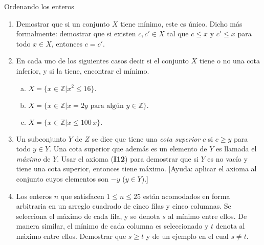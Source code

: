 \begin{section}{Ordenando los enteros}
\begin{enumerate}[1)]
\item Demostrar que si un conjunto $X$ tiene mínimo, este es único. Dicho más formalmente: demostrar que si existen $c,c' \in X$ tal que  $c\le x$ y $c'\le x$ para todo $x \in X$, entonces $c=c'$. 

\item En cada uno de los siguientes casos decir
si el conjunto $X$ tiene o no una cota inferior, y si la tiene,
encontrar el mínimo.

\begin{enumerate}[a)]
	\item $X = \{x \in \mathbb Z | x^2\le 16\}.$
	
	\item $X =\{x \in \mathbb Z | x=2y \text{\ para algún } y \in \mathbb Z\}.$
	
	\item $X =\{x \in \mathbb Z | x\le 100\,x\} .$
\end{enumerate}
%
%

\item Un subconjunto $Y$ de $Z$ se dice que tiene una {\em cota superior} $c$ si $c\ge y$ para todo $y \in Y$. 
Una cota superior que además es un elemento de $Y$ es llamada el {\em máximo} de
$Y$. Usar el axioma ({\bf I12}) para demostrar que si $Y$ es no vacío
y tiene una cota superior, entonces tiene máximo. [Ayuda: aplicar
el axioma al conjunto cuyos elementos son $-y$ ($y \in Y$).]

\item Los enteros $n$ que satisfacen $1 \le n \le 25$ están
acomodados en forma arbitraria en un arreglo cuadrado de cinco
filas y cinco columnas. Se selecciona el máximo
 de cada fila, y se denota $s$ al mínimo entre ellos.
De manera similar, el mínimo de cada columna es seleccionado y $t$
denota al máximo entre ellos. Demostrar que $s\ge t$ y de un
ejemplo en el cual $s\not=t$.
\end{enumerate}

\end{section}

